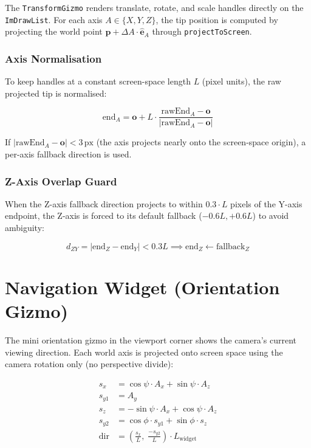 The \texttt{TransformGizmo} renders translate, rotate, and scale handles
directly on the \texttt{ImDrawList}. For each axis $A \in \{X, Y, Z\}$,
the tip position is computed by projecting the world point
$\mathbf{p} + \Delta A \cdot \hat{\mathbf{e}}_A$ through
\texttt{projectToScreen}.

\subsubsection{Axis Normalisation}

To keep handles at a constant screen-space length $L$ (pixel units),
the raw projected tip is normalised:

\begin{equation}
\text{end}_A = \mathbf{o} + L \cdot \frac{\text{rawEnd}_A - \mathbf{o}}{|\text{rawEnd}_A - \mathbf{o}|}
\end{equation}

If $|\text{rawEnd}_A - \mathbf{o}| < 3\,\text{px}$ (the axis projects
nearly onto the screen-space origin), a per-axis fallback direction is used.

\subsubsection{Z-Axis Overlap Guard}

When the Z-axis fallback direction projects to within
$0.3 \cdot L$ pixels of the Y-axis endpoint, the Z-axis is forced to
its default fallback ($-0.6L, +0.6L$) to avoid ambiguity:

\begin{equation}
d_{ZY} = |\text{end}_Z - \text{end}_Y| < 0.3L
\implies \text{end}_Z \leftarrow \text{fallback}_Z
\end{equation}

\section{Navigation Widget (Orientation Gizmo)}

The mini orientation gizmo in the viewport corner shows the camera's
current viewing direction. Each world axis is projected onto screen space
using the camera rotation only (no perspective divide):

\begin{align}
  s_x    &=  \cos\psi \cdot A_x + \sin\psi \cdot A_z \\
  s_{y1} &= A_y \\
  s_z    &= -\sin\psi \cdot A_x + \cos\psi \cdot A_z \\
  s_{y2} &= \cos\phi \cdot s_{y1} + \sin\phi \cdot s_z \\
  \text{dir} &= \left(\frac{s_x}{L},\; \frac{-s_{y2}}{L}\right) \cdot L_\text{widget}
\end{align}

